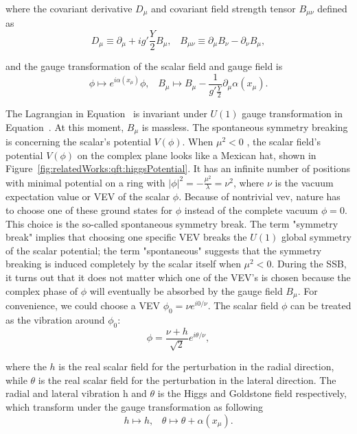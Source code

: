 \noindent where the covariant derivative $D_\mu$ and covariant field strength tensor $B_{\mu\nu}$ defined as
\begin{equation}
    D_\mu \equiv \partial_\mu +i g' \frac{Y}{2} B_\mu ,\;\;\; 
    B_{\mu\nu} \equiv  \partial_\mu B_\nu - \partial_\nu B_\mu,
\end{equation}

\noindent and the gauge transformation of the scalar field and gauge field is
\begin{equation}
	\phi \longmapsto e^{i\alpha(x_\mu)} \phi ,\;\;\; 
	B_\mu  \longmapsto  B_\mu - \frac{1}{g'\frac{Y}{2}}\partial_\mu \alpha(x_\mu).
    \label{eqn:relatedWorks:qft:u1HiggsGaugeTransform}
\end{equation}


\noindent The Lagrangian in Equation~\label{eqn:relatedWorks:qft:u1Higgs} is invariant under $U(1)$ gauge transformation in Equation~\label{eqn:relatedWorks:qft:u1HiggsGaugeTransform}. At this moment, $B_\mu$ is massless. The spontaneous symmetry breaking is concerning the scalar's potential $V(\phi)$. When $\mu^2<0$ , the scalar field's potential $V(\phi)$ on the complex plane looks like a Mexican hat, shown in Figure~\ref{fig:relatedWorks:qft:higgsPotential}. It has an infinite number of positions with minimal potential on a ring with $|\phi|^2 = -\frac{\mu^2}{\lambda} = \nu^2$, where $\nu$ is the vacuum expectation value or VEV of the scalar $\phi$. Because of nontrivial vev, nature has to choose one of these ground states for $\phi$ instead of the complete vacuum $\phi=0$. This choice is the so-called spontaneous symmetry break. The term "symmetry break" implies that choosing one specific VEV breaks the $U(1)$ global symmetry of the scalar potential; the term "spontaneous" suggests that the symmetry breaking is induced completely by the scalar itself when $\mu^2<0$. During the SSB, it turns out that it does not matter which one of the VEV's is chosen because the complex phase of $\phi$ will eventually be absorbed by the gauge field $B_\mu$. For convenience, we could choose a VEV $\phi_0 = \nu e^{i 0/\nu}$. The scalar field $\phi$ can be treated as the vibration around $\phi_0$:
\begin{equation}
    \phi = \frac{\nu + h}{\sqrt{2}}e^{i\theta/\nu}, 
\end{equation}

\noindent where the $h$ is the real scalar field for the perturbation in the radial direction, while $\theta$ is the real scalar field for the perturbation in the lateral direction. The radial and lateral vibration h and $\theta$ is the Higgs and Goldstone field respectively, which transform under the gauge transformation as following
\begin{equation}
    h  \longmapsto  h ,\;\;\; 
    \theta  \longmapsto  \theta + \alpha(x_\mu).
\end{equation}

